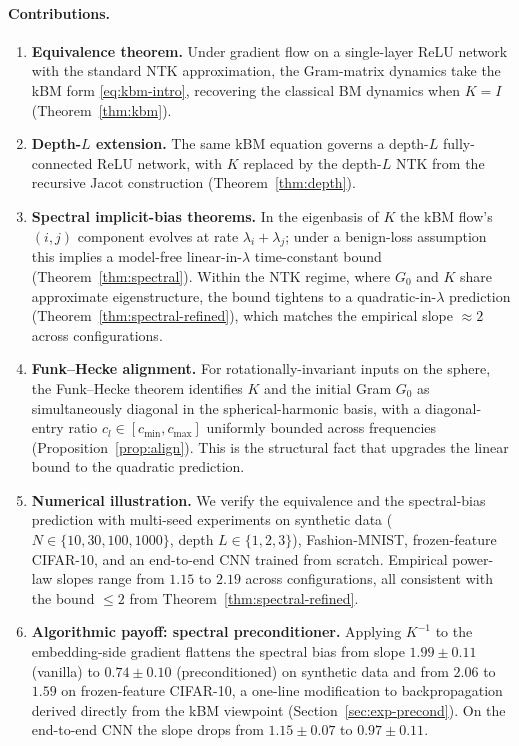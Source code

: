 \documentclass[11pt,letterpaper]{article}
\begin{document}
\paragraph{Contributions.}
\begin{enumerate}
\item \textbf{Equivalence theorem.} Under gradient flow on a single-layer
ReLU network with the standard NTK approximation, the Gram-matrix dynamics
take the kBM form \eqref{eq:kbm-intro}, recovering the classical BM dynamics
when $K = I$ (Theorem~\ref{thm:kbm}).

\item \textbf{Depth-$L$ extension.} The same kBM equation governs a
depth-$L$ fully-connected ReLU network, with $K$ replaced by the depth-$L$
NTK from the recursive Jacot construction (Theorem~\ref{thm:depth}).

\item \textbf{Spectral implicit-bias theorems.} In the eigenbasis of $K$
the kBM flow's $(i,j)$ component evolves at rate $\lambda_i + \lambda_j$;
under a benign-loss assumption this implies a model-free linear-in-$\lambda$
time-constant bound (Theorem~\ref{thm:spectral}). Within the NTK regime,
where $G_0$ and $K$ share approximate eigenstructure, the bound tightens
to a quadratic-in-$\lambda$ prediction (Theorem~\ref{thm:spectral-refined}),
which matches the empirical slope $\approx 2$ across configurations.

\item \textbf{Funk--Hecke alignment.} For rotationally-invariant inputs on
the sphere, the Funk--Hecke theorem identifies $K$ and the initial Gram
$G_0$ as simultaneously diagonal in the spherical-harmonic basis, with a
diagonal-entry ratio $c_l \in [c_{\min}, c_{\max}]$ uniformly bounded across
frequencies (Proposition~\ref{prop:align}). This is the structural fact that
upgrades the linear bound to the quadratic prediction.

\item \textbf{Numerical illustration.} We verify the equivalence and
the spectral-bias prediction with multi-seed experiments on synthetic data
($N \in \{10, 30, 100, 1000\}$, depth $L \in \{1, 2, 3\}$), Fashion-MNIST,
frozen-feature CIFAR-10, and an end-to-end CNN trained from scratch.
Empirical power-law slopes range from $1.15$ to $2.19$ across configurations,
all consistent with the bound $\leq 2$ from Theorem~\ref{thm:spectral-refined}.

\item \textbf{Algorithmic payoff: spectral preconditioner.} Applying $K^{-1}$
to the embedding-side gradient flattens the spectral bias from slope
$1.99 \pm 0.11$ (vanilla) to $0.74 \pm 0.10$ (preconditioned) on synthetic
data and from $2.06$ to $1.59$ on frozen-feature CIFAR-10, a one-line
modification to backpropagation derived directly from the kBM viewpoint
(Section~\ref{sec:exp-precond}). On the end-to-end CNN the slope drops from
$1.15 \pm 0.07$ to $0.97 \pm 0.11$.


\end{enumerate}
\end{document}
